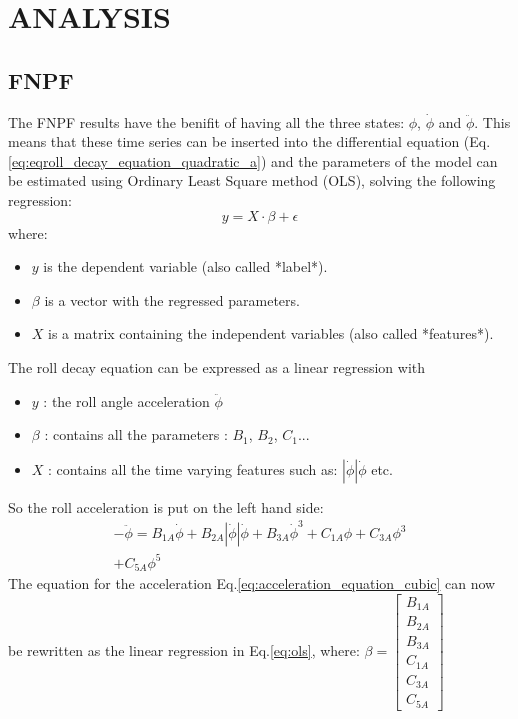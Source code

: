 \section*{ANALYSIS}\label{analysis}
\hypertarget{fnpf}{%
\subsection*{FNPF}\label{fnpf}}
The FNPF results have the benifit of having all the three states:
$\phi$, $\dot{\phi}$ and $\ddot{\phi}$. This means that these time
series can be inserted into the differential equation
(Eq.\ref{eq:eqroll_decay_equation_quadratic_a}) and the
parameters of the model can be estimated using Ordinary Least Square
method (OLS), solving the following regression:
\begin{equation}
y = X \cdot \beta + \epsilon
\label{ols}
\end{equation}
where:
\begin{itemize}
\item $y$ is the dependent variable (also called *label*).
\item $\beta$ is a vector with the regressed parameters.
\item $X$ is a matrix containing the independent variables (also called *features*).
\end{itemize}
The roll decay equation can be expressed as a linear regression with
\begin{itemize}
\item $y$ : the roll angle acceleration $\ddot{\phi}$
\item $\beta$ : contains all the parameters : $B_1$, $B_2$, $C_1$...
\item $X$ : contains all the time varying features such as: $| \dot{\phi} | \dot{\phi} $ etc.
\end{itemize}
So the roll acceleration is put on the left hand side:
\begin{equation}
\begin{aligned}
- \ddot{\phi} = B_{1A} \dot{\phi} + B_{2A} \left|{\dot{\phi}}\right| \dot{\phi} + B_{3A} \dot{\phi}^{3} + C_{1A} \phi + C_{3A} \phi^{3} \\ + C_{5A} \phi^{5}
\end{aligned}
\label{acceleration_equation_cubic}
\end{equation}
The equation for the acceleration
Eq.\ref{eq:acceleration_equation_cubic} can now be rewritten as
the linear regression in Eq.\ref{eq:ols}, where:
$\displaystyle \beta = \left[\begin{matrix}B_{1A}\\B_{2A}\\B_{3A}\\C_{1A}\\C_{3A}\\C_{5A}\end{matrix}\right]$
